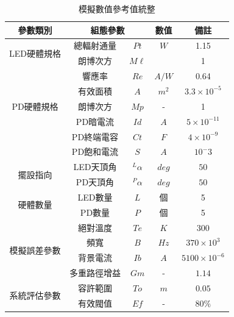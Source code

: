 \begin{table}[htpb]
    \begin{center}
      \caption{模擬數值參考值統整}
      \label{tab:para_reference}
      \begin{tabular}{|c|cc|c|c|} %
        \hline
        \textbf{參數類別}&\multicolumn{2}{|c|}{\textbf{組態參數}}  &\textbf{數值}  &  \textbf{備註}   \\
        \hline
        \multirow{2}{*}{LED硬體規格}
        & 總輻射通量 &$Pt$ & $W$ & 1.15\\
        &朗博次方& $M\ell$& &1 \\
        \hline

        \multirow{5}{*}{PD硬體規格}
        &響應率 &$Re$ & $A/W$ & 0.64\\
        &有效面積& $A$& $m^2$ &$3.3\times 10^{-5}$\\
        &朗博次方& $Mp$& - &1\\
        &PD暗電流 &$Id$ & $A$& $5\times 10^{-11}$\\
        &PD終端電容 &$Ct$ & $F$ &$4\times 10^{-9}$\\
        &PD飽和電流& $S$ &$A$&$10^-3$\\
        \hline

        \multirow{2}{*}{擺設指向}
        &LED天頂角 &$^L \alpha$ & $deg$&$50$\\
        &PD天頂角 &$^P \alpha$ & $deg$&$50$\\
        \hline

        \multirow{2}{*}{硬體數量}
        &LED數量 &$L$ & 個&5\\
        &PD數量 &$P$ & 個&5\\
        \hline

        \multirow{4}{*}{模擬誤差參數}
        &絕對溫度 &$Te$ & $K$ &  $300$\\
        &頻寬 &$B$ & $Hz$ &  $370\times 10^{3}$\\
        &背景電流&$Ib$&$A$&$5100\times 10^{-6}$\\
        &多重路徑增益&$Gm$&-&$1.14$\\
        \hline

        \multirow{2}{*}{系統評估參數}
        &容許範圍&$To$&$m$&$0.05$\\
        &有效閥值&$Ef$&-&$80\%$\\
        \hline


      \end{tabular}
    \end{center}
  \end{table}







